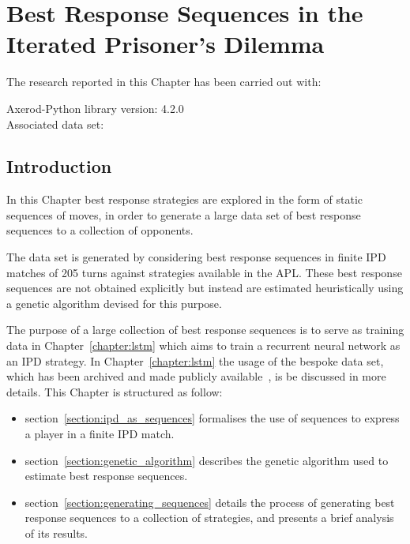\chapter{Best Response Sequences in the Iterated Prisoner's Dilemma}\label{chapter:best_response_sequence}

\begin{center}
    The research reported in this Chapter has been carried out with:

    Axerod-Python library version: 4.2.0 \\
    Associated data set: \cite{Glynatsi2020_sequences} \\ \vspace{.5cm}
\end{center}

\section{Introduction}

In this Chapter best response strategies are explored in the form
of static sequences of moves, in order to generate a large data set of best
response sequences to a collection of opponents.

The data set is generated by considering best response sequences in finite IPD
matches of 205 turns against \numberofstrategiesbestsequences strategies
available in the APL. These best response sequences are not obtained explicitly
but instead are estimated heuristically using a genetic algorithm devised for
this purpose.

The purpose of a large collection of best response sequences is
to serve as training data in Chapter~\ref{chapter:lstm} which aims to train a
recurrent neural network as an IPD strategy. In Chapter~\ref{chapter:lstm} the
usage of the bespoke data set, which has been archived and made publicly
available~\cite{Glynatsi2020_sequences}, is be discussed in more details. This
Chapter is structured as follow:

\begin{itemize}
    \item section~\ref{section:ipd_as_sequences} formalises the use of sequences to express a player in a
    finite IPD match.
    \item section~\ref{section:genetic_algorithm} describes the genetic algorithm
    used to estimate best response
    sequences.
    \item section~\ref{section:generating_sequences} details the process of
    generating best response sequences to a collection of
    \numberofstrategiesbestsequences strategies, and presents a brief analysis
    of its results.
\end{itemize}

